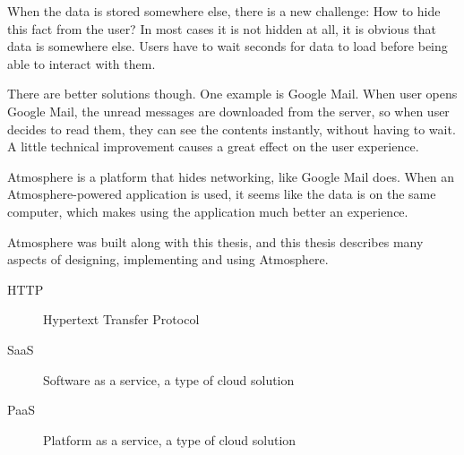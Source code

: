 \documentclass[]{tukethesis}
\begin{document}
When the data is stored somewhere else, there is a new challenge: How to hide this fact from the user? In most cases it is not hidden at all, it is obvious that data is somewhere else. Users have to wait seconds for data to load before being able to interact with them.

There are better solutions though. One example is Google Mail. When user opens Google Mail, the unread messages are downloaded from the server, so when user decides to read them, they can see the contents instantly, without having to wait. A little technical improvement causes a great effect on the user experience.

Atmosphere is a platform that hides networking, like Google Mail does. When an Atmosphere-powered application is used, it seems like the data is on the same computer, which makes using the application much better an experience.

Atmosphere was built along with this thesis, and this thesis describes many aspects of designing, implementing and using Atmosphere.
\endpreface

\thispagestyle{empty}
\tableofcontents
\newpage

\thispagestyle{empty}
\listoffigures
\newpage

\thispagestyle{empty}
\listoftables
\newpage


\listofterms %

\begin{description}
\item[HTTP] Hypertext Transfer Protocol
\item[SaaS] Software as a service, a type of cloud solution
\item[PaaS] Platform as a service, a type of cloud solution
\end{description}

\setlength{\parindent}{1cm} 
\setlength{\parskip}{0cm}

\endlistofterms
%

%














%
%
%
%
%



%
\end{document}

